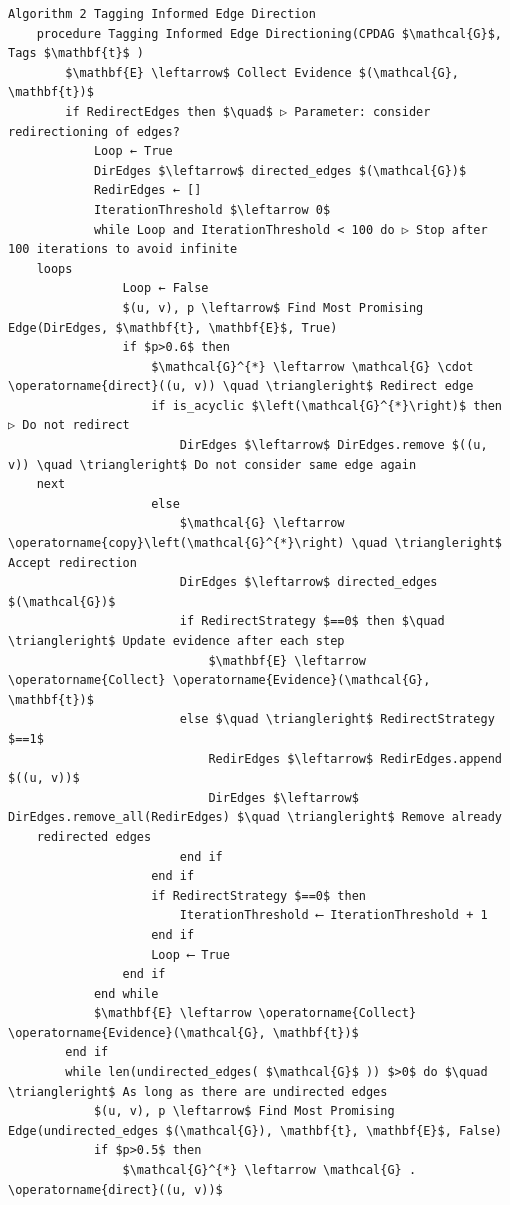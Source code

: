 \documentclass[10pt]{article}
\begin{document}
\begin{verbatim}
Algorithm 2 Tagging Informed Edge Direction
    procedure Tagging Informed Edge Directioning(CPDAG $\mathcal{G}$, Tags $\mathbf{t}$ )
        $\mathbf{E} \leftarrow$ Collect Evidence $(\mathcal{G}, \mathbf{t})$
        if RedirectEdges then $\quad$ ▷ Parameter: consider redirectioning of edges?
            Loop ← True
            DirEdges $\leftarrow$ directed_edges $(\mathcal{G})$
            RedirEdges ← []
            IterationThreshold $\leftarrow 0$
            while Loop and IterationThreshold < 100 do ▷ Stop after 100 iterations to avoid infinite
    loops
                Loop ← False
                $(u, v), p \leftarrow$ Find Most Promising Edge(DirEdges, $\mathbf{t}, \mathbf{E}$, True)
                if $p>0.6$ then
                    $\mathcal{G}^{*} \leftarrow \mathcal{G} \cdot \operatorname{direct}((u, v)) \quad \triangleright$ Redirect edge
                    if is_acyclic $\left(\mathcal{G}^{*}\right)$ then ▷ Do not redirect
                        DirEdges $\leftarrow$ DirEdges.remove $((u, v)) \quad \triangleright$ Do not consider same edge again
    next
                    else
                        $\mathcal{G} \leftarrow \operatorname{copy}\left(\mathcal{G}^{*}\right) \quad \triangleright$ Accept redirection
                        DirEdges $\leftarrow$ directed_edges $(\mathcal{G})$
                        if RedirectStrategy $==0$ then $\quad \triangleright$ Update evidence after each step
                            $\mathbf{E} \leftarrow \operatorname{Collect} \operatorname{Evidence}(\mathcal{G}, \mathbf{t})$
                        else $\quad \triangleright$ RedirectStrategy $==1$
                            RedirEdges $\leftarrow$ RedirEdges.append $((u, v))$
                            DirEdges $\leftarrow$ DirEdges.remove_all(RedirEdges) $\quad \triangleright$ Remove already
    redirected edges
                        end if
                    end if
                    if RedirectStrategy $==0$ then
                        IterationThreshold ⟵ IterationThreshold + 1
                    end if
                    Loop ⟵ True
                end if
            end while
            $\mathbf{E} \leftarrow \operatorname{Collect} \operatorname{Evidence}(\mathcal{G}, \mathbf{t})$
        end if
        while len(undirected_edges( $\mathcal{G}$ )) $>0$ do $\quad \triangleright$ As long as there are undirected edges
            $(u, v), p \leftarrow$ Find Most Promising Edge(undirected_edges $(\mathcal{G}), \mathbf{t}, \mathbf{E}$, False)
            if $p>0.5$ then
                $\mathcal{G}^{*} \leftarrow \mathcal{G} . \operatorname{direct}((u, v))$

\end{verbatim}
\end{document}
